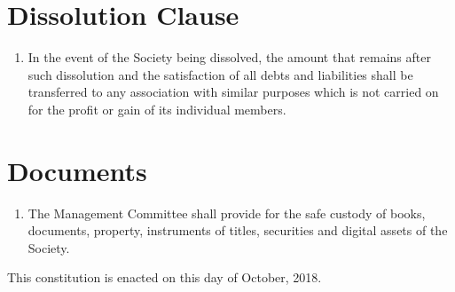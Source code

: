 \documentclass[a4paper]{article}
\newcommand*{\sectionr}[1]{{\raggedright \section{#1}}}
\begin{document}
\sectionr{Dissolution Clause}
\begin{enumerate}
\item In the event of the Society being dissolved, the amount  that remains after such dissolution and the satisfaction of all debts and liabilities shall be transferred to any association with similar purposes which is not carried on for the profit or gain of its individual members.
\end{enumerate}

\sectionr{Documents}
\begin{enumerate}
\item The Management Committee shall provide for the safe custody of books, documents, property, instruments of titles, securities and digital assets of the Society.
\end{enumerate}

\vspace{\fill}
This constitution is enacted on this  day of October, 2018.
\end{document}
